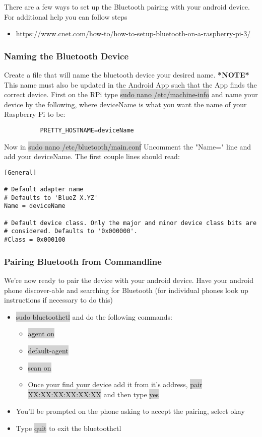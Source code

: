 \documentclass[12pt]{article}
\begin{document}
There are a few ways to set up the Bluetooth pairing with your android device. For additional help you can follow steps  
\begin{itemize}
	\item \href{https://www.cnet.com/how-to/how-to-setup-bluetooth-on-a-raspberry-pi-3/}{https://www.cnet.com/how-to/how-to-setup-bluetooth-on-a-raspberry-pi-3/}
\end{itemize}
\subsubsection{Naming the Bluetooth Device}

Create a file that will name the bluetooth device your desired name. \textbf{*NOTE*} This name must also be updated in the Android App such that the App finds the correct device. First on the RPi type \colorbox{lightgray}{sudo nano /etc/machine-info} and name your device by the following, where deviceName is what you want the name of your Raspberry Pi to be:
\begin{verbatim}
          PRETTY_HOSTNAME=deviceName
\end{verbatim}

\noindent Now in \colorbox{lightgray}{sudo nano /etc/bluetooth/main.conf} Uncomment the "Name=" line and add your deviceName. The first couple lines should read:

\begin{verbatim}
[General]

# Default adapter name
# Defaults to 'BlueZ X.YZ'
Name = deviceName

# Default device class. Only the major and minor device class bits are
# considered. Defaults to '0x000000'.
#Class = 0x000100
\end{verbatim}

\subsubsection{Pairing Bluetooth from Commandline}
We're now ready to pair the device with your android device. Have your android phone discover-able and searching for Bluetooth (for individual phones look up instructions if necessary to do this)
\begin{itemize}
	\item[] \colorbox{lightgray}{sudo bluetoothctl} and do the following commands:
	\begin{itemize}
		\item[] \colorbox{lightgray}{agent on}
		\item[] \colorbox{lightgray}{default-agent}
		\item[] \colorbox{lightgray}{scan on}
		\item[] Once your find your device add it from it's address, \colorbox{lightgray}{pair XX:XX:XX:XX:XX:XX} and then type \colorbox{lightgray}{yes}
	\end{itemize}
	\item[] You'll be prompted on the phone asking to accept the pairing, select okay
	\item[] Type \colorbox{lightgray}{quit} to exit the bluetoothctl
\end{itemize}
\end{document}
